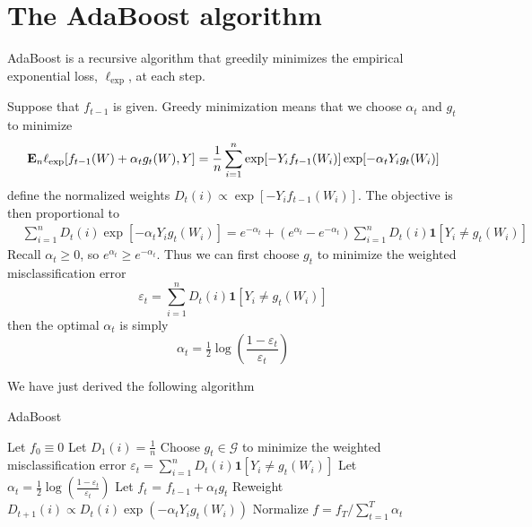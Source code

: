 \section{The AdaBoost algorithm}
\label{sec:adaboost_derive}

AdaBoost is a recursive algorithm that greedily minimizes the empirical exponential loss, $\ell_\text{exp}$, at each step.

Suppose that $f_{t-1}$ is given. Greedy minimization means that we choose $\alpha_t$ and $g_t$ to minimize
\begin{equation*}
	\mathbf{E}_n \ell_\text{exp} [f_{t-1}(W) + \alpha_t g_t(W), Y] = \frac{1}{n} \sum_{i=1}^n \exp[-Y_i f_{t-1}(W_i)]\exp[-\alpha_t Y_i g_t(W_i)]
\end{equation*}
define the normalized weights $D_t(i) \propto \exp[-Y_i f_{t-1}(W_i)]$. The objective is then proportional to
\begin{align}
	\label{eq:adaboost_empirical_loss}
	&\sum_{i=1}^n D_t(i)\exp[-\alpha_t Y_i g_t(W_i)] = e^{-\alpha_t} + (e^{\alpha_t} - e^{-\alpha_t}) \sum_{i=1}^n D_t(i)\mathbf{1}[Y_i \ne g_t(W_i)]
\end{align}
Recall $\alpha_t \ge 0$, so $e^{\alpha_t} \ge e^{-\alpha_t}$. Thus we can first choose $g_t$ to minimize the weighted misclassification error
\begin{equation*}
	\varepsilon_t = \sum_{i=1}^n D_t(i)\mathbf{1}[Y_i \ne g_t(W_i)]
\end{equation*}
then the optimal $\alpha_t$ is simply
\begin{equation}
	\label{eq:adaboost_alpha_optim}
	\alpha_t = \tfrac{1}{2}\log \left(\frac{1 - \varepsilon_t}{\varepsilon_t}\right)
\end{equation}

We have just derived the following algorithm
\begin{algorithm}
\caption{AdaBoost}
   \begin{algorithmic}[1] \label{alg:adaboost}
   \STATE Let $f_0 \equiv 0$
   \STATE Let $D_1(i) = \tfrac{1}{n}$
   	\STATE Choose $g_t \in \mathcal{G}$ to minimize the weighted misclassification error $\varepsilon_t = \sum_{i=1}^n D_t(i)\mathbf{1}[Y_i \ne g_t(W_i)]$
   	\STATE Let $\alpha_t = \tfrac{1}{2}\log \left(\frac{1 - \varepsilon_t}{\varepsilon_t}\right)$
    \STATE Let $f_t$ = $f_{t-1} + \alpha_t g_t$
    \STATE Reweight $D_{t+1}(i) \propto D_{t}(i)\exp(-\alpha_t Y_i g_t(W_i))$
   \ENDFOR
   \STATE Normalize $f = f_T/\sum_{t=1}^T \alpha_t$
\end{algorithmic}
\end{algorithm}

